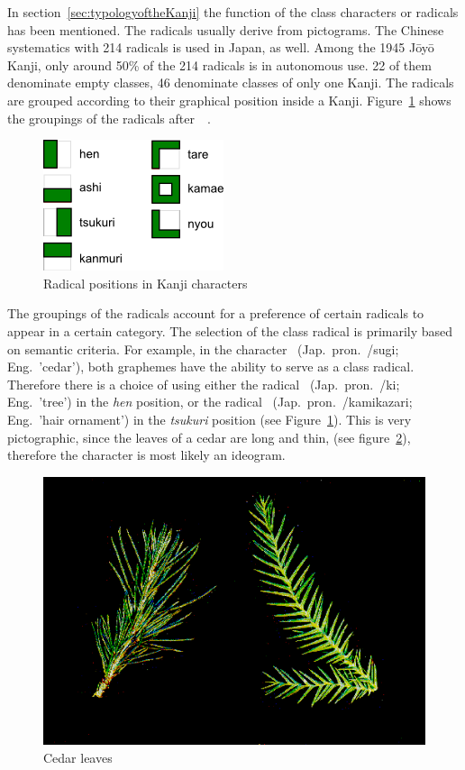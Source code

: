 In section~\ref{sec:typologyoftheKanji} the function of the class characters or
radicals has been mentioned. The radicals usually derive from pictograms. The
Chinese systematics with 214 radicals is used in Japan, as well. Among the 
1945 Jōyō Kanji, only around 50\% of the 214 radicals is in autonomous use.
22 of them denominate empty classes, 46 denominate classes of only one Kanji.
The radicals are grouped according to their graphical position inside a Kanji.
Figure~\ref{fig:radicalPositions} shows the groupings of the radicals 
after~~\citeyear{Foljanty1984}.
\begin{figure}[htbp]
\begin{center}
\includegraphics{images/radicalStructure/radicalPositions.png}
\caption{Radical positions in Kanji characters}
\label{fig:radicalPositions}
\end{center}
\end{figure}
The groupings of the radicals account for a preference of certain radicals
to appear in a certain category. The selection of the class radical is primarily
based on semantic criteria. For example, in the character ~(Jap.\ pron.\ 
/sugi; Eng.\ 'cedar'), both graphemes have the ability to serve as a 
class radical. Therefore there is a choice of using either the radical 
\cjk{木}~(Jap.\ pron.\ \cjk{キ}/ki; Eng.\ 'tree') in the \emph{hen} position, 
or the radical \cjk{彡}~(Jap.\ pron.\ \cjk{カミカザリ}/kamikazari; 
Eng.\ 'hair ornament') in the \emph{tsukuri} position (see 
Figure~\ref{fig:radicalPositions}). This is very pictographic, since the leaves
of a cedar are long and thin, (see figure~\ref{fig:cedarleaves}), 
therefore the character is most likely an ideogram.
\begin{figure}[htbp]
\begin{center}
\includegraphics[scale=0.4]{images/radicalStructure/cedar.png}
\caption{Cedar leaves}
\label{fig:cedarleaves}
\end{center}
\end{figure}
